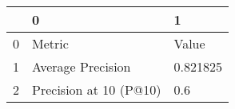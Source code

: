 \begin{tabular}{lll}
\toprule
{} &                       0 &         1 \\
\midrule
0 &                  Metric &     Value \\
1 &       Average Precision &  0.821825 \\
2 &  Precision at 10 (P@10) &       0.6 \\
\bottomrule
\end{tabular}
